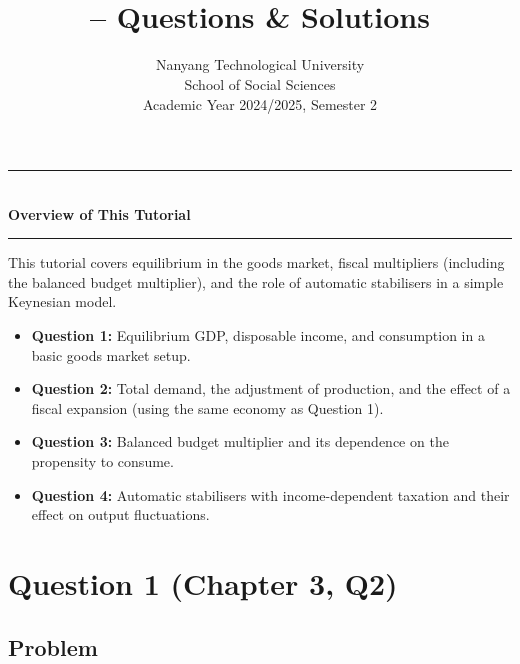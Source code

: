 \documentclass[12pt]{article}
\title{
\CourseCode \CourseName \\[0.3em]
\large \DocType -- Questions \& Solutions
}
\author{
Nanyang Technological University \\[-0.1em]
School of Social Sciences \\[0.35em]
Academic Year 2024/2025, Semester 2
}
\date{}
\begin{document}

\maketitle
\thispagestyle{plainfirst}
\pagestyle{main}

\bigskip


\begin{center}
\rule{0.8\textwidth}{0.4pt}\\[4pt]
\textbf{Overview of This Tutorial}\\[2pt]
\rule{0.8\textwidth}{0.4pt}
\end{center}

\noindent
This tutorial covers equilibrium in the goods market, fiscal multipliers (including the balanced budget multiplier), and the role of automatic stabilisers in a simple Keynesian model.

\begin{itemize}[leftmargin=*]
\item \textbf{Question 1:} Equilibrium GDP, disposable income, and consumption in a basic goods market setup.
\item \textbf{Question 2:} Total demand, the adjustment of production, and the effect of a fiscal expansion (using the same economy as Question 1).
\item \textbf{Question 3:} Balanced budget multiplier and its dependence on the propensity to consume.
\item \textbf{Question 4:} Automatic stabilisers with income-dependent taxation and their effect on output fluctuations.
\end{itemize}

\bigskip


\newpage

\section*{Question 1 (Chapter 3, Q2)}

\subsection*{Problem}
\end{document}
